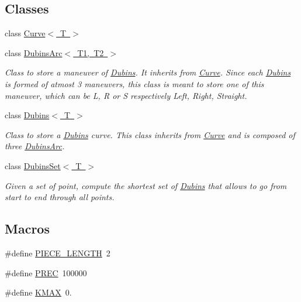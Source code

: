 \subsection*{Classes}
\begin{DoxyCompactItemize}
\item 
class \mbox{\hyperlink{class_curve}{Curve$<$ T $>$}}
\item 
class \mbox{\hyperlink{class_dubins_arc}{Dubins\+Arc$<$ T1, T2 $>$}}
\begin{DoxyCompactList}\small\item\em Class to store a maneuver of \mbox{\hyperlink{class_dubins}{Dubins}}. It inherits from {\ttfamily \mbox{\hyperlink{class_curve}{Curve}}}. Since each \mbox{\hyperlink{class_dubins}{Dubins}} is formed of atmost 3 maneuvers, this class is meant to store one of this maneuver, which can be L, R or S respectively Left, Right, Straight. \end{DoxyCompactList}\item 
class \mbox{\hyperlink{class_dubins}{Dubins$<$ T $>$}}
\begin{DoxyCompactList}\small\item\em Class to store a \mbox{\hyperlink{class_dubins}{Dubins}} curve. This class inherits from {\ttfamily \mbox{\hyperlink{class_curve}{Curve}}} and is composed of three {\ttfamily \mbox{\hyperlink{class_dubins_arc}{Dubins\+Arc}}}. \end{DoxyCompactList}\item 
class \mbox{\hyperlink{class_dubins_set}{Dubins\+Set$<$ T $>$}}
\begin{DoxyCompactList}\small\item\em Given a set of point, compute the shortest set of \mbox{\hyperlink{class_dubins}{Dubins}} that allows to go from start to end through all points. \end{DoxyCompactList}\end{DoxyCompactItemize}
\subsection*{Macros}
\begin{DoxyCompactItemize}
\item 
\#define \mbox{\hyperlink{dubins_8hh_a5b2500ca93a5100f73dc442d3cfea7d4}{P\+I\+E\+C\+E\+\_\+\+L\+E\+N\+G\+TH}}~2
\item 
\#define \mbox{\hyperlink{dubins_8hh_a2bda1a81ce3474772a8a1f165e54516e}{P\+R\+EC}}~100000
\item 
\#define \mbox{\hyperlink{dubins_8hh_a940b85a83458e94519f2685b33ddd276}{K\+M\+AX}}~0.
\end{DoxyCompactItemize}
